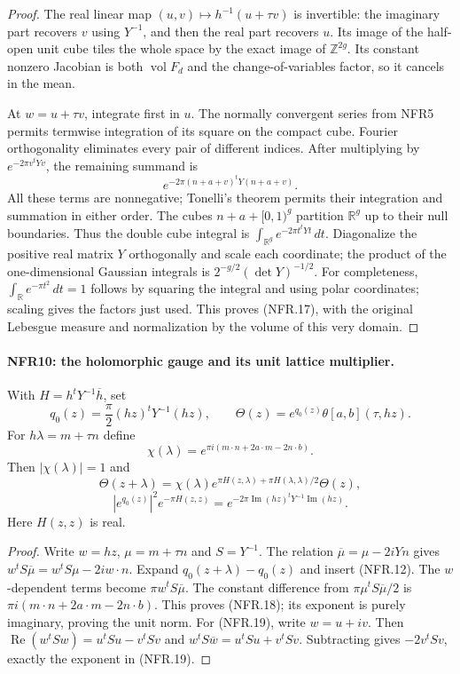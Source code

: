 \documentclass[11pt,a4paper]{article}
\numberwithin{equation}{section}
\theoremstyle{remark}\newtheorem{remark}[theorem]{Remark}
\begin{document}
\begin{proof}
The real linear map $(u,v)\mapsto h^{-1}(u+\tau v)$ is invertible:
the imaginary part recovers $v$ using $Y^{-1}$, and then the
real part recovers $u$.  Its image of the half-open unit cube
tiles the whole space by the exact image of $\mathbb Z^{2g}$.
Its constant nonzero Jacobian is both $\operatorname{vol}F_d$
and the change-of-variables factor, so it cancels in the mean.

At $w=u+\tau v$, integrate first in $u$.
The normally convergent series from NFR5 permits termwise
integration of its square on the compact cube.
Fourier orthogonality eliminates every pair of different indices.
After multiplying by $e^{-2\pi v^tYv}$, the remaining summand is
\[
                       e^{-2\pi(n+a+v)^tY(n+a+v)}.
\]
All these terms are nonnegative; Tonelli's theorem permits their
integration and summation in either order.  The cubes
$n+a+[0,1)^g$ partition $\mathbb R^g$ up to their null boundaries.
Thus the double cube integral is
$\int_{\mathbb R^g}e^{-2\pi t^tYt}\,dt$.
Diagonalize the positive real matrix $Y$ orthogonally and scale
each coordinate; the product of the one-dimensional Gaussian
integrals is $2^{-g/2}(\det Y)^{-1/2}$.
For completeness, $\int_{\mathbb R}e^{-\pi t^2}\,dt=1$
follows by squaring the integral and using polar coordinates;
scaling gives the factors just used.
This proves (NFR.17), with the original Lebesgue measure and
normalization by the volume of this very domain.
\end{proof}

\paragraph{NFR10: the holomorphic gauge and its unit lattice multiplier.}
\label{claim:NFR10}
With $H=h^tY^{-1}\overline h$, set
\[
 q_0(z)=\frac\pi2(hz)^tY^{-1}(hz),\qquad
 \Theta(z)=e^{q_0(z)}\theta[a,b](\tau,hz).
\]
For $h\lambda=m+\tau n$ define
\[
 \chi(\lambda)=e^{\pi i(m\cdot n+2a\cdot m-2n\cdot b)}.
\]
Then $|\chi(\lambda)|=1$ and
\[
 \Theta(z+\lambda)=\chi(\lambda)
       e^{\pi H(z,\lambda)+\pi H(\lambda,\lambda)/2}\Theta(z),
 \tag{NFR.18}
\]
\[
 |e^{q_0(z)}|^2e^{-\pi H(z,z)}
             =e^{-2\pi\operatorname{Im}(hz)^tY^{-1}\operatorname{Im}(hz)}.
 \tag{NFR.19}
\]
Here $H(z,z)$ is real.

\begin{proof}
Write $w=hz$, $\mu=m+\tau n$ and $S=Y^{-1}$.
The relation $\overline\mu=\mu-2iYn$ gives
$w^tS\overline\mu=w^tS\mu-2iw\cdot n$.
Expand $q_0(z+\lambda)-q_0(z)$ and insert (NFR.12).
The $w$-dependent terms become $\pi w^tS\overline\mu$.
The constant difference from
$\pi\mu^tS\overline\mu/2$ is
$\pi i(m\cdot n+2a\cdot m-2n\cdot b)$.
This proves (NFR.18); its exponent is purely imaginary, proving
the unit norm.  For (NFR.19), write $w=u+iv$.
Then $\operatorname{Re}(w^tSw)=u^tSu-v^tSv$ and
$w^tS\overline w=u^tSu+v^tSv$.
Subtracting gives $-2v^tSv$, exactly the exponent in (NFR.19).
\end{proof}
\end{document}
